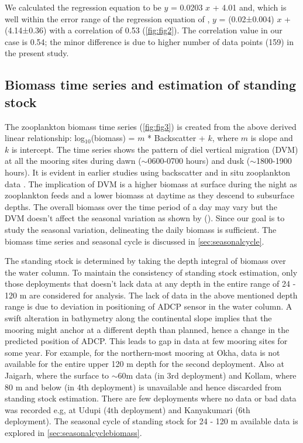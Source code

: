 \documentclass{article}
\begin{document}
	We calculated the regression equation to be $y$ = 0.0203 $x$  + 4.01 and, which is well within the error range of the regression equation of \citep{aparna2022seasonal}, $y$ = (0.02±0.004) $x$ + (4.14±0.36) with a correlation of 0.53 (\cref{fig:fig2}). The correlation value in our case is 0.54; the minor difference is  due to higher number of data points (159) in the present study. 
	
	\subsection{Biomass time series and estimation of standing stock}
	
	The zooplankton biomass time series (\cref{fig:fig3}) is created from the above derived linear relationship: log$_{10}$(biomass) = $m$ * Backscatter + $k$, where $m$ is slope and $k$ is intercept. The time series shows the pattern of diel vertical migration (DVM) at all the mooring sites during dawn ($\sim$0600-0700 hours) and dusk ($\sim$1800-1900 hours). It is evident in earlier studies using backscatter \citep{ashjian2002distribution, smith2005mesozooplankton, inoue2016diel,ursella2018evidence} and in situ zooplankton data \citep{padmavati1998vertical}. The implication of DVM is a higher biomass at surface during the night as zooplankton feeds and a lower biomass at daytime as they descend to subsurface depths. The overall biomass over the time period of a day may vary but the DVM doesn't affect the seasonal variation as shown by (\citep{jiang2007temporal,aparna2022seasonal}). Since our goal is to study the seasonal variation, delineating the daily biomass is sufficient. The biomass time series and seasonal cycle is discussed in \autoref{sec:seasonalcycle}.
	
	The standing stock is determined by taking the depth integral of biomass over the water column. To maintain the consistency of standing stock estimation, only those deployments that doesn't lack data at any depth in the entire range of 24 - 120 m are considered for analysis. The lack of data in the above mentioned depth range is due to deviation in positioning of ADCP sensor in the water column. A swift alteration in bathymetry along the continental slope implies that the mooring might anchor at a different depth than planned, hence a change in the predicted position of ADCP. This leads to gap in data at few mooring sites for some year. For example, for the northern-most mooring at Okha, data is not available for the entire upper 120 m depth for the second deployment. Also at Jaigarh, where the surface to $\sim$60m data (in 3rd deployment) and Kollam, where 80 m and below (in 4th deployment) is unavailable and hence discarded from standing stock estimation. There are few deployments where no data or bad data was recorded e.g, at Udupi (4th deployment) and Kanyakumari (6th deployment). The seasonal cycle of standing stock for 24 - 120 m available data is explored in \autoref{sec:seasonalcyclebiomass}.
	
\end{document}
